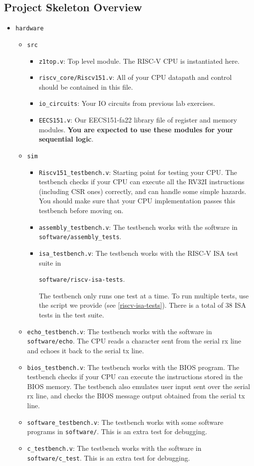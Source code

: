 \documentclass[11pt]{article}
\begin{document}
\subsection{Project Skeleton Overview}
\begin{itemize}
  \item \texttt{hardware}
    \begin{itemize}
      \item \texttt{src}
        \begin{itemize}
          \item \texttt{z1top.v}: Top level module. The RISC-V CPU is instantiated here.
          \item \texttt{riscv\_core/Riscv151.v}: All of your CPU datapath and control should be contained in this file.
          \item \texttt{io\_circuits}: Your IO circuits from previous lab exercises.
          \item \texttt{EECS151.v}: Our EECS151-fa22 library file of register and memory modules. \textbf{You are expected to use these modules for your sequential logic}.
        \end{itemize}
      \item \texttt{sim}
        \begin{itemize}
          \item \verb|Riscv151_testbench.v|: Starting point for testing your CPU. The testbench checks if your CPU can execute all the RV32I instructions (including CSR ones) correctly, and can handle some simple hazards. You should make sure that your CPU implementation passes this testbench before moving on.
          \item \verb|assembly_testbench.v|: The testbench works with the software in \texttt{software/assembly\_tests}.
          \item \verb|isa_testbench.v|: The testbench works with the RISC-V ISA test suite in

\texttt{software/riscv-isa-tests}.

The testbench only runs one test at a time. To run multiple tests, use the script we provide (see \ref{riscv-isa-tests}). There is a total of 38 ISA tests in the test suite.
        \end{itemize}
          \item \verb|echo_testbench.v|: The testbench works with the software in \texttt{software/echo}. The CPU reads a character sent from the serial rx line and echoes it back to the serial tx line.
          \item \verb|bios_testbench.v|: The testbench works with the BIOS program. The testbench checks if your CPU can execute the instructions stored in the BIOS memory. The testbench also emulates user input sent over the serial rx line, and checks the BIOS message output obtained from the serial tx line.
          \item \verb|software_testbench.v|: The testbench works with some software programs in \texttt{software/}. This is an extra test for debugging.
          \item \verb|c_testbench.v|: The testbench works with the software in \texttt{software/c\_test}. This is an extra test for debugging.


\end{itemize}
\end{itemize}
\end{document}
